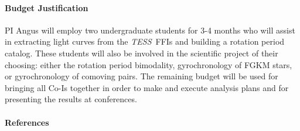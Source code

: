 \documentclass[letterpaper,12pt,preprint]{hack_aastex}
\newcommand{\tess}{{\it TESS}}
\begin{document}
\paragraph{Budget Justification}
PI Angus will employ two undergraduate students for 3-4 months who will assist
in extracting light curves from the \tess\ FFIs and building a rotation period
catalog.
These students will also be involved in the scientific project of their
choosing: either the rotation period bimodality, gyrochronology of FGKM stars,
or gyrochronology of comoving pairs.
The remaining budget will be used for bringing all Co-Is together in order
to make and execute analysis plans and for presenting the results at
conferences.
\paragraph{References}

{\footnotesize

}
\end{document}
